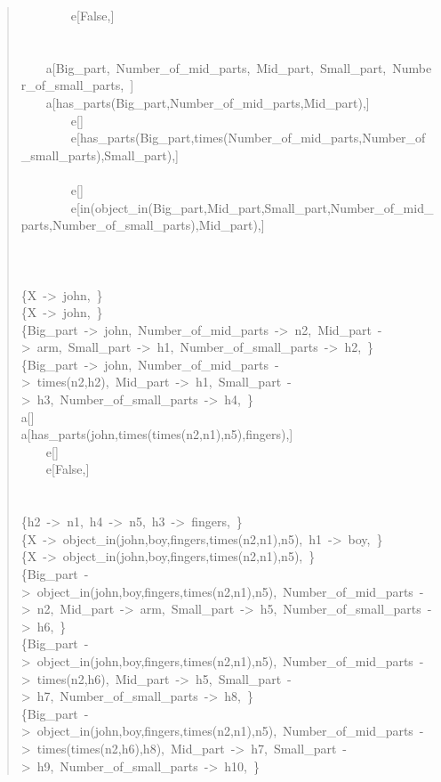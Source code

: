 \begin{quote}
~~~~~~~~e[False,]\\
~\\
~\\
~~~~a[Big\_part,~Number\_of\_mid\_parts,~Mid\_part,~Small\_part,~Number\_of\_small\_parts,~]\\
~~~~a[has\_parts(Big\_part,Number\_of\_mid\_parts,Mid\_part),]\\
~~~~~~~~e[]\\
~~~~~~~~e[has\_parts(Big\_part,times(Number\_of\_mid\_parts,Number\_of\_small\_parts),Small\_part),]\\
~\\
~~~~~~~~e[]\\
~~~~~~~~e[in(object\_in(Big\_part,Mid\_part,Small\_part,Number\_of\_mid\_parts,Number\_of\_small\_parts),Mid\_part),]\\
~\\
~\\
~\\
\{X~->~john,~\}\\
\{X~->~john,~\}\\
\{Big\_part~->~john,~Number\_of\_mid\_parts~->~n2,~Mid\_part~->~arm,~Small\_part~->~h1,~Number\_of\_small\_parts~->~h2,~\}\\
\{Big\_part~->~john,~Number\_of\_mid\_parts~->~times(n2,h2),~Mid\_part~->~h1,~Small\_part~->~h3,~Number\_of\_small\_parts~->~h4,~\}\\
a[]\\
a[has\_parts(john,times(times(n2,n1),n5),fingers),]\\
~~~~e[]\\
~~~~e[False,]\\
~\\
~\\
\{h2~->~n1,~h4~->~n5,~h3~->~fingers,~\}\\
\{X~->~object\_in(john,boy,fingers,times(n2,n1),n5),~h1~->~boy,~\}\\
\{X~->~object\_in(john,boy,fingers,times(n2,n1),n5),~\}\\
\{Big\_part~->~object\_in(john,boy,fingers,times(n2,n1),n5),~Number\_of\_mid\_parts~->~n2,~Mid\_part~->~arm,~Small\_part~->~h5,~Number\_of\_small\_parts~->~h6,~\}\\
\{Big\_part~->~object\_in(john,boy,fingers,times(n2,n1),n5),~Number\_of\_mid\_parts~->~times(n2,h6),~Mid\_part~->~h5,~Small\_part~->~h7,~Number\_of\_small\_parts~->~h8,~\}\\
\{Big\_part~->~object\_in(john,boy,fingers,times(n2,n1),n5),~Number\_of\_mid\_parts~->~times(times(n2,h6),h8),~Mid\_part~->~h7,~Small\_part~->~h9,~Number\_of\_small\_parts~->~h10,~\}\\

\end{quote}
